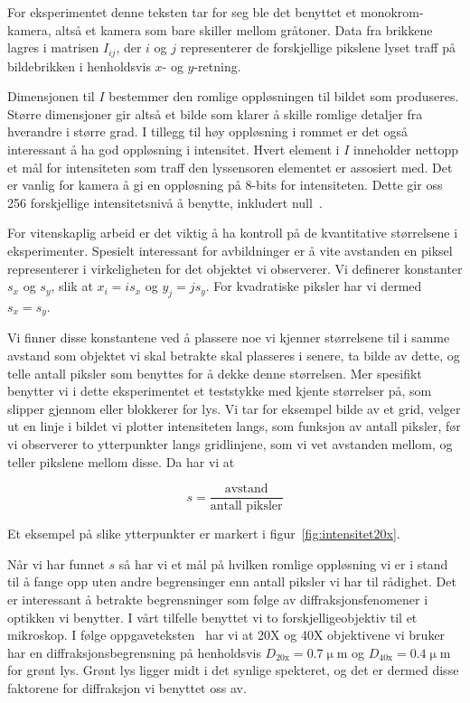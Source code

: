 \documentclass[a4paper,11pt, twocolumn]{article}
\begin{document}
For eksperimentet denne teksten tar for seg ble det benyttet et monokrom-kamera, altså et kamera som bare skiller mellom gråtoner. Data fra brikkene lagres i matrisen $I_{ij}$, der $i$ og $j$ representerer de forskjellige pikslene lyset traff på bildebrikken i henholdsvis $x$- og $y$-retning.

Dimensjonen til $I$ bestemmer den romlige oppløsningen til bildet som produseres. Større dimensjoner gir altså et bilde som klarer å skille romlige detaljer fra hverandre i større grad. I tillegg til høy oppløsning i rommet er det også interessant å ha god oppløsning i intensitet. Hvert element i $I$ inneholder nettopp et mål for intensiteten som traff den lyssensoren elementet er assosiert med. Det er vanlig for kamera å gi en oppløsning på 8-bits for intensiteten. Dette gir oss 256 forskjellige intensitetsnivå å benytte, inkludert null~\cite{brownske}.

For vitenskaplig arbeid er det viktig å ha kontroll på de kvantitative størrelsene i eksperimenter. Spesielt interessant for avbildninger er å vite avstanden en piksel representerer i virkeligheten for det objektet vi observerer. Vi definerer konstanter $s_x$ og $s_y$, slik at $x_i= is_x$ og $y_j=js_y$. For kvadratiske piksler har vi dermed $s_x=s_y$.

Vi finner disse konstantene ved å plassere noe vi kjenner størrelsene til i samme avstand som objektet vi skal betrakte skal plasseres i senere, ta bilde av dette, og telle antall piksler som benyttes for å dekke denne størrelsen. Mer spesifikt benytter vi i dette eksperimentet et teststykke med kjente størrelser på, som slipper gjennom eller blokkerer for lys. Vi tar for eksempel bilde av et grid, velger ut en linje i bildet vi plotter intensiteten langs, som funksjon av antall piksler, før vi observerer to ytterpunkter langs gridlinjene, som vi vet avstanden mellom, og teller pikslene mellom disse. Da har vi at 

\begin{equation}
	s=\frac{\text{avstand}}{\text{antall piksler}}
\end{equation}

Et eksempel på slike ytterpunkter er markert i figur~\ref{fig:intensitet20x}.

Når vi har funnet $s$ så har vi et mål på hvilken romlige oppløsning vi er i stand til å fange opp uten andre begrensinger enn antall piksler vi har til rådighet. Det er interessant å betrakte begrensninger som følge av diffraksjonsfenomener i optikken vi benytter. I vårt tilfelle benyttet vi to forskjelligeobjektiv til et mikroskop. I følge oppgaveteksten~\cite{Schroeder2000} har vi at 20X og 40X objektivene vi bruker har en diffraksjonsbegrensning på henholdsvis $D_{20\text{x}}=0.7\upmu\text{m}$ og $D_{40\text{x}}=0.4\upmu\text{m}$ for grønt lys. Grønt lys ligger midt i det synlige spekteret, og det er dermed disse faktorene for diffraksjon vi benyttet oss av. 
\end{document}
